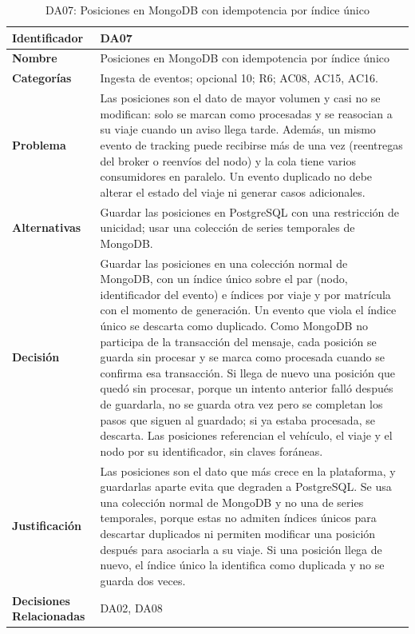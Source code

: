 \begin{table}[H]
    \small
    \centering
    \caption{DA07: Posiciones en MongoDB con idempotencia por índice único}
    \label{tab:da07}
    \begin{tabular}{|p{4.1cm}|p{11.7cm}|}
        \hline
            \textbf{Identificador} & DA07 \\
        \hline
            \textbf{Nombre} & Posiciones en MongoDB con idempotencia por índice único \\
        \hline
            \textbf{Categorías} & Ingesta de eventos; opcional 10; R6; AC08, AC15, AC16. \\
        \hline
            \textbf{Problema} & Las posiciones son el dato de mayor volumen y casi no se modifican: solo se marcan como procesadas y se reasocian a su viaje cuando un aviso llega tarde. Además, un mismo evento de tracking puede recibirse más de una vez (reentregas del broker o reenvíos del nodo) y la cola tiene varios consumidores en paralelo. Un evento duplicado no debe alterar el estado del viaje ni generar casos adicionales. \\
        \hline
            \textbf{Alternativas} & Guardar las posiciones en PostgreSQL con una restricción de unicidad; usar una colección de series temporales de MongoDB. \\
        \hline
            \textbf{Decisión} & Guardar las posiciones en una colección normal de MongoDB, con un índice único sobre el par (nodo, identificador del evento) e índices por viaje y por matrícula con el momento de generación. Un evento que viola el índice único se descarta como duplicado. Como MongoDB no participa de la transacción del mensaje, cada posición se guarda sin procesar y se marca como procesada cuando se confirma esa transacción. Si llega de nuevo una posición que quedó sin procesar, porque un intento anterior falló después de guardarla, no se guarda otra vez pero se completan los pasos que siguen al guardado; si ya estaba procesada, se descarta. Las posiciones referencian el vehículo, el viaje y el nodo por su identificador, sin claves foráneas. \\
        \hline
            \textbf{Justificación} & Las posiciones son el dato que más crece en la plataforma, y guardarlas aparte evita que degraden a PostgreSQL. Se usa una colección normal de MongoDB y no una de series temporales, porque estas no admiten índices únicos para descartar duplicados ni permiten modificar una posición después para asociarla a su viaje. Si una posición llega de nuevo, el índice único la identifica como duplicada y no se guarda dos veces. \\
        \hline
            \textbf{Decisiones Relacionadas} & DA02, DA08 \\
        \hline
    \end{tabular}
\end{table}

